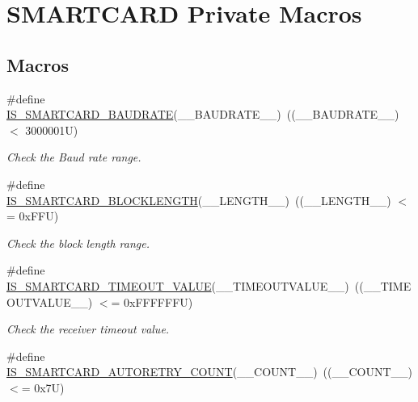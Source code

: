 \hypertarget{group___s_m_a_r_t_c_a_r_d___private___macros}{}\section{S\+M\+A\+R\+T\+C\+A\+RD Private Macros}
\label{group___s_m_a_r_t_c_a_r_d___private___macros}
\subsection*{Macros}
\begin{DoxyCompactItemize}
\item 
\#define \hyperlink{group___s_m_a_r_t_c_a_r_d___private___macros_ga5bb07276b107ec9ad4afece205a8fe2a}{I\+S\+\_\+\+S\+M\+A\+R\+T\+C\+A\+R\+D\+\_\+\+B\+A\+U\+D\+R\+A\+TE}(\+\_\+\+\_\+\+B\+A\+U\+D\+R\+A\+T\+E\+\_\+\+\_\+)~((\+\_\+\+\_\+\+B\+A\+U\+D\+R\+A\+T\+E\+\_\+\+\_\+) $<$ 3000001\+U)
\begin{DoxyCompactList}\small\item\em Check the Baud rate range. \end{DoxyCompactList}\item 
\#define \hyperlink{group___s_m_a_r_t_c_a_r_d___private___macros_ga23ec81fa2d39464f2b0a45664cb82308}{I\+S\+\_\+\+S\+M\+A\+R\+T\+C\+A\+R\+D\+\_\+\+B\+L\+O\+C\+K\+L\+E\+N\+G\+TH}(\+\_\+\+\_\+\+L\+E\+N\+G\+T\+H\+\_\+\+\_\+)~((\+\_\+\+\_\+\+L\+E\+N\+G\+T\+H\+\_\+\+\_\+) $<$= 0x\+F\+F\+U)
\begin{DoxyCompactList}\small\item\em Check the block length range. \end{DoxyCompactList}\item 
\#define \hyperlink{group___s_m_a_r_t_c_a_r_d___private___macros_gaa813ac55690877657161d7f282820b03}{I\+S\+\_\+\+S\+M\+A\+R\+T\+C\+A\+R\+D\+\_\+\+T\+I\+M\+E\+O\+U\+T\+\_\+\+V\+A\+L\+UE}(\+\_\+\+\_\+\+T\+I\+M\+E\+O\+U\+T\+V\+A\+L\+U\+E\+\_\+\+\_\+)~((\+\_\+\+\_\+\+T\+I\+M\+E\+O\+U\+T\+V\+A\+L\+U\+E\+\_\+\+\_\+) $<$= 0x\+F\+F\+F\+F\+F\+F\+U)
\begin{DoxyCompactList}\small\item\em Check the receiver timeout value. \end{DoxyCompactList}\item 
\#define \hyperlink{group___s_m_a_r_t_c_a_r_d___private___macros_ga96eec21125d71b530e34803f404f1541}{I\+S\+\_\+\+S\+M\+A\+R\+T\+C\+A\+R\+D\+\_\+\+A\+U\+T\+O\+R\+E\+T\+R\+Y\+\_\+\+C\+O\+U\+NT}(\+\_\+\+\_\+\+C\+O\+U\+N\+T\+\_\+\+\_\+)~((\+\_\+\+\_\+\+C\+O\+U\+N\+T\+\_\+\+\_\+) $<$= 0x7\+U)

\end{DoxyCompactItemize}
